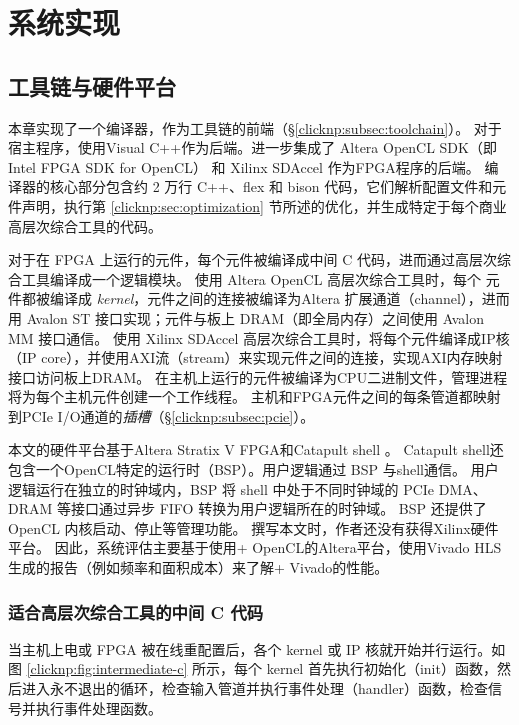 \section{系统实现}
\label{clicknp:sec:impl}

\subsection{\name 工具链与硬件平台}

本章实现了一个\name 编译器，作为\name 工具链的前端（\S \ref {clicknp:subsec:toolchain}）。
对于宿主程序，使用Visual C++作为后端。进一步集成了 Altera OpenCL SDK（即 Intel FPGA SDK for OpenCL） \cite {aoc} 和 Xilinx SDAccel \cite {vivado}作为FPGA程序的后端。
\name 编译器的核心部分包含约 2 万行 C++、flex 和 bison 代码，它们解析配置文件和元件声明，执行第 \ref {clicknp:sec:optimization} 节所述的优化，并生成特定于每个商业高层次综合工具的代码。

对于在 FPGA 上运行的元件，每个元件被编译成中间 C 代码，进而通过高层次综合工具编译成一个逻辑模块。
使用 Altera OpenCL 高层次综合工具时，每个 \name 元件都被编译成 \textit {kernel}，元件之间的连接被编译为Altera 扩展通道（channel），进而用 Avalon ST 接口实现；元件与板上 DRAM（即全局内存）之间使用 Avalon MM 接口通信。
使用 Xilinx SDAccel 高层次综合工具时，将每个元件编译成IP核（IP core），并使用AXI流（stream）来实现元件之间的连接，实现AXI内存映射接口访问板上DRAM。
在主机上运行的元件被编译为CPU二进制文件，管理进程将为每个主机元件创建一个工作线程。
主机和FPGA元件之间的每条管道都映射到PCIe I/O通道的\textit {插槽}（\S \ref {clicknp:subsec:pcie}）。

本文的硬件平台基于Altera Stratix V FPGA和Catapult shell \cite {putnam2014reconfigurable}。
Catapult shell还包含一个OpenCL特定的运行时（BSP）。\name 用户逻辑通过 BSP 与shell通信。
\name 用户逻辑运行在独立的时钟域内，BSP 将 shell 中处于不同时钟域的 PCIe DMA、DRAM 等接口通过异步 FIFO 转换为用户逻辑所在的时钟域。
BSP 还提供了 OpenCL 内核启动、停止等管理功能。
撰写本文时，作者还没有获得Xilinx硬件平台。
因此，系统评估主要基于使用\name + OpenCL的Altera平台，使用Vivado HLS生成的报告（例如频率和面积成本）来了解\name + Vivado的性能。


\subsubsection{适合高层次综合工具的中间 C 代码}

当主机上电或 FPGA 被在线重配置后，各个 kernel 或 IP 核就开始并行运行。如图 \ref{clicknp:fig:intermediate-c} 所示，每个 kernel 首先执行初始化（init）函数，然后进入永不退出的循环，检查输入管道并执行事件处理（handler）函数，检查信号并执行事件处理函数。

